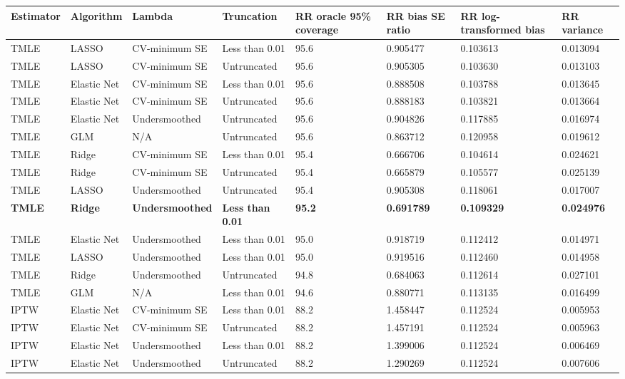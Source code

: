 
\begin{longtable}[l]{llllllll}
\toprule
Estimator & Algorithm & Lambda & Truncation & RR oracle 95\% coverage & RR bias SE ratio & RR log-transformed bias & RR variance\\
\midrule
TMLE & LASSO & CV-minimum SE & Less than 0.01 & 95.6 & 0.905477 & 0.103613 & 0.013094\\
TMLE & LASSO & CV-minimum SE & Untruncated & 95.6 & 0.905305 & 0.103630 & 0.013103\\
TMLE & Elastic Net & CV-minimum SE & Less than 0.01 & 95.6 & 0.888508 & 0.103788 & 0.013645\\
TMLE & Elastic Net & CV-minimum SE & Untruncated & 95.6 & 0.888183 & 0.103821 & 0.013664\\
TMLE & Elastic Net & Undersmoothed & Untruncated & 95.6 & 0.904826 & 0.117885 & 0.016974\\
TMLE & GLM & N/A & Untruncated & 95.6 & 0.863712 & 0.120958 & 0.019612\\
TMLE & Ridge & CV-minimum SE & Less than 0.01 & 95.4 & 0.666706 & 0.104614 & 0.024621\\
TMLE & Ridge & CV-minimum SE & Untruncated & 95.4 & 0.665879 & 0.105577 & 0.025139\\
TMLE & LASSO & Undersmoothed & Untruncated & 95.4 & 0.905308 & 0.118061 & 0.017007\\
\midrule
\textbf{TMLE} & \textbf{Ridge} & \textbf{Undersmoothed} & \textbf{Less than 0.01} & \textbf{95.2} & \textbf{0.691789} & \textbf{0.109329} & \textbf{0.024976}\\
\midrule
TMLE & Elastic Net & Undersmoothed & Less than 0.01 & 95.0 & 0.918719 & 0.112412 & 0.014971\\
TMLE & LASSO & Undersmoothed & Less than 0.01 & 95.0 & 0.919516 & 0.112460 & 0.014958\\
TMLE & Ridge & Undersmoothed & Untruncated & 94.8 & 0.684063 & 0.112614 & 0.027101\\
TMLE & GLM & N/A & Less than 0.01 & 94.6 & 0.880771 & 0.113135 & 0.016499\\
IPTW & Elastic Net & CV-minimum SE & Less than 0.01 & 88.2 & 1.458447 & 0.112524 & 0.005953\\
IPTW & Elastic Net & CV-minimum SE & Untruncated & 88.2 & 1.457191 & 0.112524 & 0.005963\\
IPTW & Elastic Net & Undersmoothed & Less than 0.01 & 88.2 & 1.399006 & 0.112524 & 0.006469\\
IPTW & Elastic Net & Undersmoothed & Untruncated & 88.2 & 1.290269 & 0.112524 & 0.007606\\

\end{longtable}
